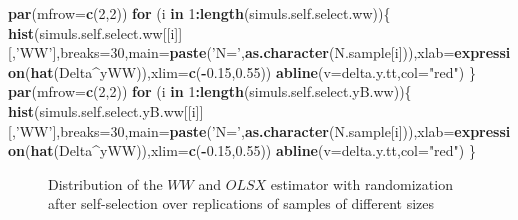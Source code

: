 \documentclass[]{book}
\newenvironment{Shaded}{\begin{snugshade}}{\end{snugshade}}
\newcommand{\KeywordTok}[1]{\textcolor[rgb]{0.13,0.29,0.53}{\textbf{#1}}}
\newcommand{\DataTypeTok}[1]{\textcolor[rgb]{0.13,0.29,0.53}{#1}}
\newcommand{\DecValTok}[1]{\textcolor[rgb]{0.00,0.00,0.81}{#1}}
\newcommand{\FloatTok}[1]{\textcolor[rgb]{0.00,0.00,0.81}{#1}}
\newcommand{\StringTok}[1]{\textcolor[rgb]{0.31,0.60,0.02}{#1}}
\newcommand{\ControlFlowTok}[1]{\textcolor[rgb]{0.13,0.29,0.53}{\textbf{#1}}}
\newcommand{\OperatorTok}[1]{\textcolor[rgb]{0.81,0.36,0.00}{\textbf{#1}}}
\newcommand{\NormalTok}[1]{#1}
\theoremstyle{definition}
\theoremstyle{definition}
\theoremstyle{definition}
\theoremstyle{remark}
\begin{document}
\begin{Shaded}
\begin{Highlighting}[]
\KeywordTok{par}\NormalTok{(}\DataTypeTok{mfrow=}\KeywordTok{c}\NormalTok{(}\DecValTok{2}\NormalTok{,}\DecValTok{2}\NormalTok{))}
\ControlFlowTok{for}\NormalTok{ (i }\ControlFlowTok{in} \DecValTok{1}\OperatorTok{:}\KeywordTok{length}\NormalTok{(simuls.self.select.ww))\{}
  \KeywordTok{hist}\NormalTok{(simuls.self.select.ww[[i]][,}\StringTok{'WW'}\NormalTok{],}\DataTypeTok{breaks=}\DecValTok{30}\NormalTok{,}\DataTypeTok{main=}\KeywordTok{paste}\NormalTok{(}\StringTok{'N='}\NormalTok{,}\KeywordTok{as.character}\NormalTok{(N.sample[i])),}\DataTypeTok{xlab=}\KeywordTok{expression}\NormalTok{(}\KeywordTok{hat}\NormalTok{(Delta}\OperatorTok{^}\NormalTok{yWW)),}\DataTypeTok{xlim=}\KeywordTok{c}\NormalTok{(}\OperatorTok{-}\FloatTok{0.15}\NormalTok{,}\FloatTok{0.55}\NormalTok{))}
  \KeywordTok{abline}\NormalTok{(}\DataTypeTok{v=}\NormalTok{delta.y.tt,}\DataTypeTok{col=}\StringTok{"red"}\NormalTok{)}
\NormalTok{\}}
\KeywordTok{par}\NormalTok{(}\DataTypeTok{mfrow=}\KeywordTok{c}\NormalTok{(}\DecValTok{2}\NormalTok{,}\DecValTok{2}\NormalTok{))}
\ControlFlowTok{for}\NormalTok{ (i }\ControlFlowTok{in} \DecValTok{1}\OperatorTok{:}\KeywordTok{length}\NormalTok{(simuls.self.select.yB.ww))\{}
  \KeywordTok{hist}\NormalTok{(simuls.self.select.yB.ww[[i]][,}\StringTok{'WW'}\NormalTok{],}\DataTypeTok{breaks=}\DecValTok{30}\NormalTok{,}\DataTypeTok{main=}\KeywordTok{paste}\NormalTok{(}\StringTok{'N='}\NormalTok{,}\KeywordTok{as.character}\NormalTok{(N.sample[i])),}\DataTypeTok{xlab=}\KeywordTok{expression}\NormalTok{(}\KeywordTok{hat}\NormalTok{(Delta}\OperatorTok{^}\NormalTok{yWW)),}\DataTypeTok{xlim=}\KeywordTok{c}\NormalTok{(}\OperatorTok{-}\FloatTok{0.15}\NormalTok{,}\FloatTok{0.55}\NormalTok{))}
  \KeywordTok{abline}\NormalTok{(}\DataTypeTok{v=}\NormalTok{delta.y.tt,}\DataTypeTok{col=}\StringTok{"red"}\NormalTok{)}
\NormalTok{\}}
\end{Highlighting}
\end{Shaded}

\begin{figure}[htbp]

{\centering {}

}

\caption{Distribution of the $WW$ and $OLSX$ estimator with randomization after self-selection over replications of samples of different sizes}\label{fig:montecarlohistselfselectww}
\end{figure}
\end{document}
